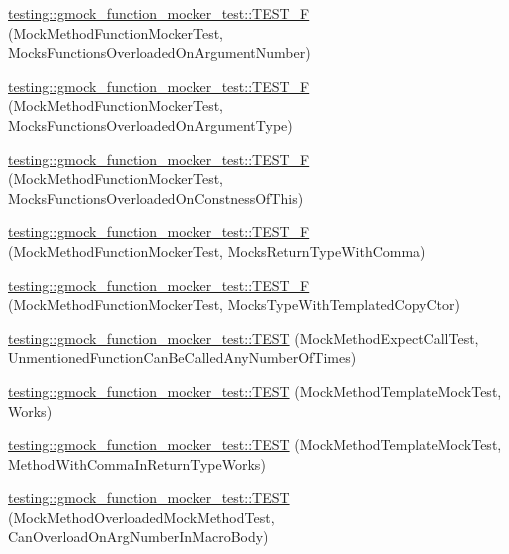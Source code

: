 \begin{DoxyCompactItemize}
\item 
\mbox{\hyperlink{namespacetesting_1_1gmock__function__mocker__test_a5292d0a0d949ed39564f82149fa5c022}{testing\+::gmock\+\_\+function\+\_\+mocker\+\_\+test\+::\+T\+E\+S\+T\+\_\+F}} (Mock\+Method\+Function\+Mocker\+Test, Mocks\+Functions\+Overloaded\+On\+Argument\+Number)
\item 
\mbox{\hyperlink{namespacetesting_1_1gmock__function__mocker__test_a0da05f5bda501f5b86249eddc2f1d4b0}{testing\+::gmock\+\_\+function\+\_\+mocker\+\_\+test\+::\+T\+E\+S\+T\+\_\+F}} (Mock\+Method\+Function\+Mocker\+Test, Mocks\+Functions\+Overloaded\+On\+Argument\+Type)
\item 
\mbox{\hyperlink{namespacetesting_1_1gmock__function__mocker__test_a25b8c84174c3773f52bba3f15f3bb180}{testing\+::gmock\+\_\+function\+\_\+mocker\+\_\+test\+::\+T\+E\+S\+T\+\_\+F}} (Mock\+Method\+Function\+Mocker\+Test, Mocks\+Functions\+Overloaded\+On\+Constness\+Of\+This)
\item 
\mbox{\hyperlink{namespacetesting_1_1gmock__function__mocker__test_a7761cd0e2989b3f40b8e5cdf118a1570}{testing\+::gmock\+\_\+function\+\_\+mocker\+\_\+test\+::\+T\+E\+S\+T\+\_\+F}} (Mock\+Method\+Function\+Mocker\+Test, Mocks\+Return\+Type\+With\+Comma)
\item 
\mbox{\hyperlink{namespacetesting_1_1gmock__function__mocker__test_a1cebea8200248ab7277dedb21f245a5a}{testing\+::gmock\+\_\+function\+\_\+mocker\+\_\+test\+::\+T\+E\+S\+T\+\_\+F}} (Mock\+Method\+Function\+Mocker\+Test, Mocks\+Type\+With\+Templated\+Copy\+Ctor)
\item 
\mbox{\hyperlink{namespacetesting_1_1gmock__function__mocker__test_a8f4b0e0a16f93fdd615ee3a793a0f4f0}{testing\+::gmock\+\_\+function\+\_\+mocker\+\_\+test\+::\+T\+E\+ST}} (Mock\+Method\+Expect\+Call\+Test, Unmentioned\+Function\+Can\+Be\+Called\+Any\+Number\+Of\+Times)
\item 
\mbox{\hyperlink{namespacetesting_1_1gmock__function__mocker__test_a3b97782f7265abf757aa472b6dbe4972}{testing\+::gmock\+\_\+function\+\_\+mocker\+\_\+test\+::\+T\+E\+ST}} (Mock\+Method\+Template\+Mock\+Test, Works)
\item 
\mbox{\hyperlink{namespacetesting_1_1gmock__function__mocker__test_af3c7ad8b0cb50a8a40b72672b13826f7}{testing\+::gmock\+\_\+function\+\_\+mocker\+\_\+test\+::\+T\+E\+ST}} (Mock\+Method\+Template\+Mock\+Test, Method\+With\+Comma\+In\+Return\+Type\+Works)
\item 
\mbox{\hyperlink{namespacetesting_1_1gmock__function__mocker__test_ab1358739e5588f66cf39320e89464447}{testing\+::gmock\+\_\+function\+\_\+mocker\+\_\+test\+::\+T\+E\+ST}} (Mock\+Method\+Overloaded\+Mock\+Method\+Test, Can\+Overload\+On\+Arg\+Number\+In\+Macro\+Body)

\end{DoxyCompactItemize}

